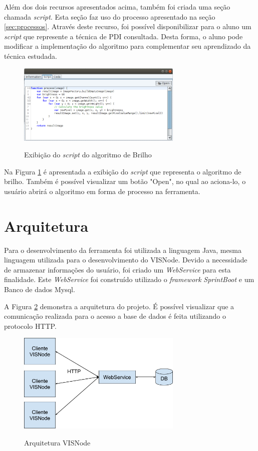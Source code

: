 \documentclass[
	12pt,				%
	oneside,			%
	a4paper,			%
	english,			%
	french,				%
	spanish,			%
	brazil,				%
	]{abntex2}
\begin{document}
Além dos dois recursos apresentados acima, também foi criada uma seção chamada \textit{script}. Esta seção faz uso do processo apresentado na seção \ref{sec:processos}. Através deste recurso, foi possível disponibilizar para o aluno um \textit{script} que represente a técnica de PDI consultada. Desta forma, o aluno pode modificar a implementação do algoritmo para complementar seu aprendizado da técnica estudada.

\begin{figure}[ht]
\centering
\caption{Exibição do \textit{script} do algoritmo de Brilho}
\includegraphics[width=0.7\textwidth]{imagens/visnode_script.png}
\sourceAuthor
\label{fig:visnodeScript}
\end{figure}

Na Figura \ref{fig:visnodeScript} é apresentada a exibição do \textit{script} que representa o algoritmo de brilho. Também é possível visualizar um botão "Open", no qual ao aciona-lo, o usuário abrirá o algoritmo em forma de processo na ferramenta.

\section{Arquitetura}

Para o desenvolvimento da ferramenta foi utilizada a linguagem Java, mesma linguagem utilizada para o desenvolvimento do VISNode. Devido a necessidade de armazenar informações do usuário, foi criado um \textit{WebService} para esta finalidade. Este \textit{WebService} foi construído utilizado o \textit{framework} \textit{SprintBoot} e um Banco de dados Mysql.

A Figura \ref{fig:visnodeArquitetura} demonstra a arquitetura do projeto. É possível visualizar que a comunicação realizada para o acesso a base de dados é feita utilizando o protocolo HTTP. 

\begin{figure}[ht]
\centering
\caption{Arquitetura VISNode}
\includegraphics[width=0.7\textwidth]{imagens/visnode_arquitetura.png}
\sourceAuthor
\label{fig:visnodeArquitetura}
\end{figure}
\end{document}
